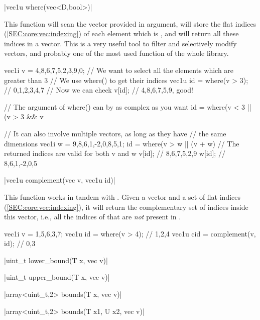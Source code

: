 \funcitem \cppinline|vec1u where(vec<D,bool>)| 

This function will scan the  vector provided in argument, will store the flat indices (\ref{SEC:core:vec:indexing}) of each element which is \cpptrue, and will return all these indices in a vector. This is a very useful tool to filter and selectively modify vectors, and probably one of the most used function of the whole library.

\begin{example}
\begin{cppcode}
vec1i v = {4,8,6,7,5,2,3,9,0};
// We want to select all the elements which are greater than 3
// We use where() to get their indices
vec1u id = where(v > 3); // {0,1,2,3,4,7}
// Now we can check
v[id]; // {4,8,6,7,5,9}, good!

// The argument of where() can by as complex as you want
id = where(v < 3 || (v > 3 && v %

// It can also involve multiple vectors, as long as they have
// the same dimensions
vec1i w = {9,8,6,1,-2,0,8,5,1};
id = where(v > w || (v + w) %
// The returned indices are valid for both v and w
v[id]; // {8,6,7,5,2,9}
w[id]; // {8,6,1,-2,0,5}
\end{cppcode}
\end{example}

\funcitem \cppinline|vec1u complement(vec v, vec1u id)| 

This function works in tandem with . Given a vector  and a set of flat indices  (\ref{SEC:core:vec:indexing}), it will return the complementary set of indices inside this vector, i.e., all the indices of  that are \emph{not} present in .

\begin{example}
\begin{cppcode}
vec1i v = {1,5,6,3,7};
vec1u id = where(v > 4); // {1,2,4}
vec1u cid = complement(v, id); // {0,3}
\end{cppcode}
\end{example}

\funcitem \cppinline|uint_t lower_bound(T x, vec v)| 

\cppinline|uint_t upper_bound(T x, vec v)| 

\cppinline|array<uint_t,2> bounds(T x, vec v)| 

\cppinline|array<uint_t,2> bounds(T x1, U x2, vec v)|

